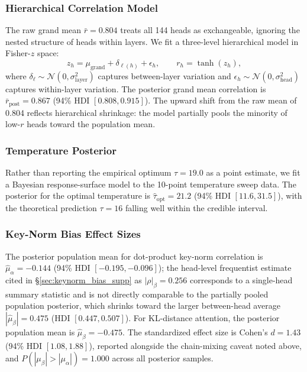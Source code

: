 \documentclass[twoside,11pt]{article}
\begin{document}
\subsubsection{Hierarchical Correlation Model}

The raw grand mean $\bar{r} = 0.804$ treats all 144 heads as exchangeable, ignoring the nested structure of heads within layers. We fit a three-level hierarchical model in Fisher-$z$ space:
\begin{equation}
z_h = \mu_{\mathrm{grand}} + \delta_{\ell(h)} + \epsilon_h, \qquad r_h = \tanh(z_h),
\end{equation}
where $\delta_\ell \sim \mathcal{N}(0, \sigma_{\mathrm{layer}}^2)$ captures between-layer variation and $\epsilon_h \sim \mathcal{N}(0, \sigma_{\mathrm{head}}^2)$ captures within-layer variation. The posterior grand mean correlation is $\bar{r}_{\mathrm{post}} = 0.867$ (94\% HDI $[0.808, 0.915]$). The upward shift from the raw mean of 0.804 reflects hierarchical shrinkage: the model partially pools the minority of low-$r$ heads toward the population mean.

\subsubsection{Temperature Posterior}

Rather than reporting the empirical optimum $\tau = 19.0$ as a point estimate, we fit a Bayesian response-surface model to the 10-point temperature sweep data. The posterior for the optimal temperature is $\hat{\tau}_{\mathrm{opt}} = 21.2$ (94\% HDI $[11.6, 31.5]$), with the theoretical prediction $\tau = 16$ falling well within the credible interval.

\subsubsection{Key-Norm Bias Effect Sizes}

The posterior population mean for dot-product key-norm correlation is $\hat{\mu}_\alpha = -0.144$ (94\% HDI $[-0.195, -0.096]$); the head-level frequentist estimate cited in \S\ref{sec:keynorm_bias_supp} as $|\rho|_\beta = 0.256$ corresponds to a single-head summary statistic and is not directly comparable to the partially pooled population posterior, which shrinks toward the larger between-head average $|\hat\mu_\beta| = 0.475$ (HDI $[0.447, 0.507]$). For KL-distance attention, the posterior population mean is $\hat{\mu}_\beta = -0.475$. The standardized effect size is Cohen's $d = 1.43$ (94\% HDI $[1.08, 1.88]$), reported alongside the chain-mixing caveat noted above, and $P(|\mu_\beta| > |\mu_\alpha|) = 1.000$ across all posterior samples.
\end{document}
